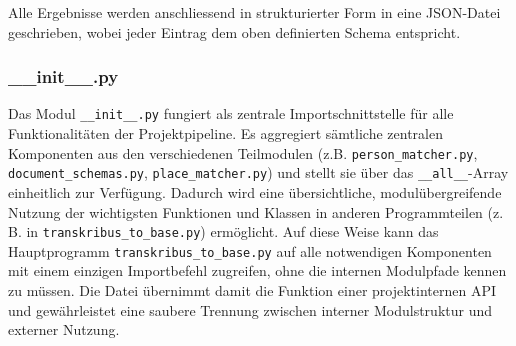 \documentclass[12pt, a4paper, ngerman, bidi=default]{article}
\newcommand{\code}[1]{\colorbox{VeryLightGray}{\texttt{#1}}} %
\begin{document}
Alle Ergebnisse werden anschliessend in strukturierter Form in eine JSON-Datei geschrieben, wobei jeder Eintrag dem oben definierten Schema 
entspricht. 
\subsubsection{\_\_init\_\_.py}\label{subsec:init_module}
Das Modul \code{\_\_init\_\_.py} fungiert als zentrale Importschnittstelle für alle Funktionalitäten der Projektpipeline. Es aggregiert sämtliche zentralen Komponenten aus den verschiedenen Teilmodulen (z.B. \code{person\_matcher.py}, \code{document\_schemas.py}, \code{place\_matcher.py}) und stellt sie über das \code{\_\_all\_\_}-Array einheitlich zur Verfügung. Dadurch wird eine übersichtliche, modulübergreifende Nutzung der wichtigsten Funktionen und Klassen in anderen Programmteilen (z.\,B. in \code{transkribus\_to\_base.py}) ermöglicht.
Auf diese Weise kann das Hauptprogramm \code{transkribus\_to\_base.py} auf alle notwendigen Komponenten mit einem einzigen Importbefehl zugreifen, ohne die internen Modulpfade kennen zu müssen. Die Datei übernimmt damit die Funktion einer projektinternen API und gewährleistet eine saubere Trennung zwischen interner Modulstruktur und externer Nutzung. 
\end{document}
